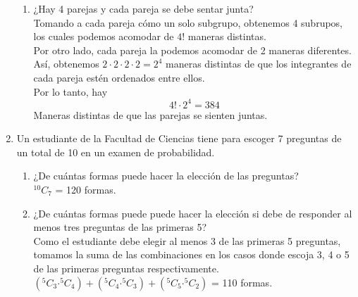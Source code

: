 \documentclass[12pt,a4paper]{report}
\newcommand*{\Comb}[2]{{}^{#1}C_{#2}}
\begin{document}
\begin{enumerate}
{\begin{enumerate}[label=\alph*) ]
{   }

   \item {
   ¿Hay 4 parejas y cada pareja se debe sentar junta?\\
   Tomando a cada pareja cómo un solo subgrupo, obtenemos 4 subrupos, los cuales podemos acomodar de $4!$ maneras distintas.\\
    Por otro lado, cada pareja la podemos acomodar de 2 maneras diferentes. Así, obtenemos $2 \cdot 2 \cdot 2 \cdot 2 = 2^4$ maneras distintas de que los integrantes de cada pareja estén ordenados entre ellos.\\
    Por lo tanto, hay $$ 4! \cdot 2^4 = 384$$ Maneras distintas de que las parejas se sienten juntas. 

   }

	\end{enumerate}

    }

   \item {
    Un estudiante de la Facultad de Ciencias tiene para escoger 7 preguntas
    de un total de 10 en un examen de probabilidad.\\

	\begin{enumerate}[label=\alph*) ]
   \item {
   ¿De cuántas formas puede hacer la elección de las preguntas?\\
	
	$\Comb{10}{7}$ = 120 formas.\\

   }

   \item {
   ¿De cuántas formas puede puede hacer la elección si debe de responder
   al menos tres preguntas de las primeras 5?\\

	Como el estudiante debe elegir al menos 3 de las primeras 5 preguntas, tomamos la suma de las combinaciones en los casos donde escoja 3, 4 o 5 de las primeras preguntas respectivamente.  \\

         $(\Comb{5}{3} \boldsymbol{\cdot} \Comb{5}{4}) +(\Comb{5}{4} \boldsymbol{\cdot} \Comb{5}{3}) +(\Comb{5}{5} \boldsymbol{\cdot} \Comb{5}{2})$ = 110 formas.\\

   }
	\end{enumerate}
    }
\end{enumerate}
\end{document}
